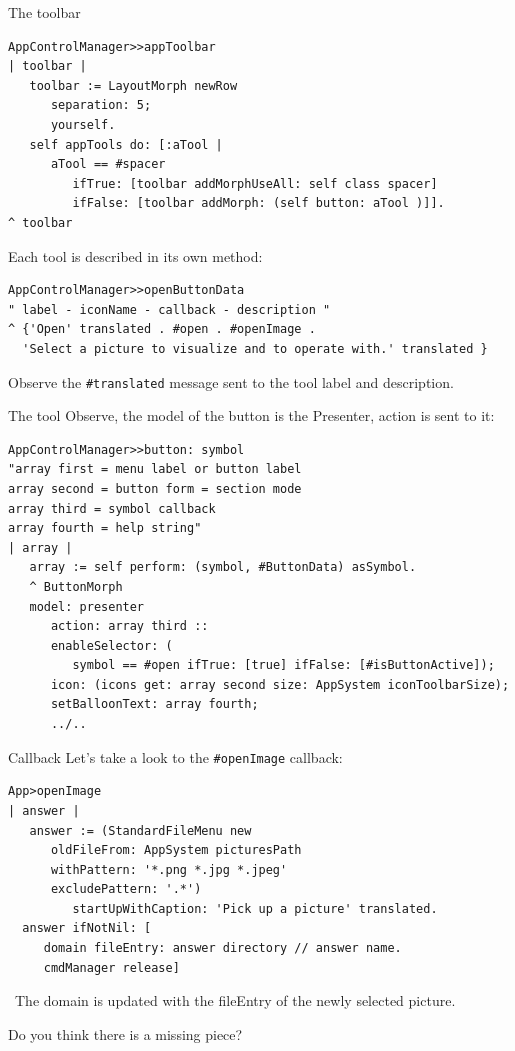 \documentclass{beamer}
\newcommand{\tip}{\boldmath{\textcolor{red}{$\Rightarrow$}}}
\begin{document}
\begin{frame}[fragile]{The toolbar}
  \fontsize{10pt}{8pt}\selectfont
\begin{lstlisting}[language=Smalltalk]
AppControlManager>>appToolbar
| toolbar |
   toolbar := LayoutMorph newRow 
      separation: 5; 
      yourself.
   self appTools do: [:aTool | 
      aTool == #spacer 
         ifTrue: [toolbar addMorphUseAll: self class spacer]
         ifFalse: [toolbar addMorph: (self button: aTool )]].
^ toolbar    
  \end{lstlisting}

Each tool is described in its own method:
\fontsize{9pt}{8pt}\selectfont
\begin{lstlisting}[language=Smalltalk]
AppControlManager>>openButtonData
" label - iconName - callback - description "
^ {'Open' translated . #open . #openImage .
  'Select a picture to visualize and to operate with.' translated }
\end{lstlisting}

Observe the \texttt{\#translated} message sent to the tool label and
description.
\end{frame}
\begin{frame}[fragile]{The tool}
Observe, the model of the button is the Presenter, action is sent to it:
 \fontsize{9pt}{8pt}\selectfont
  \begin{lstlisting}[language=Smalltalk]
AppControlManager>>button: symbol
"array first = menu label or button label
array second = button form = section mode
array third = symbol callback
array fourth = help string"	
| array |
   array := self perform: (symbol, #ButtonData) asSymbol.
   ^ ButtonMorph 
   model: presenter
      action: array third ::
      enableSelector: (
         symbol == #open ifTrue: [true] ifFalse: [#isButtonActive]);
      icon: (icons get: array second size: AppSystem iconToolbarSize);
      setBalloonText: array fourth;
      ../..
  \end{lstlisting}  
\end{frame}

\begin{frame}[fragile]{Callback}
  Let's take a look to the \texttt{\#openImage} callback:
 \fontsize{9pt}{8pt}\selectfont
  \begin{lstlisting}[language=Smalltalk]
App>openImage
| answer |
   answer := (StandardFileMenu new
      oldFileFrom: AppSystem picturesPath
      withPattern: '*.png *.jpg *.jpeg'
      excludePattern: '.*')
         startUpWithCaption: 'Pick up a picture' translated.
  answer ifNotNil: [
     domain fileEntry: answer directory // answer name.
     cmdManager release]
 \end{lstlisting}
 \fontsize{11pt}{8pt}\selectfont

 \tip\ The domain is updated with the fileEntry of the newly selected
 picture.
 
 Do you think there is a missing piece?
\end{frame}
\end{document}
